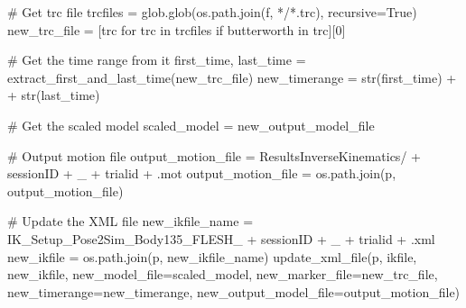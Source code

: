 \documentclass[
  letterpaper,
  DIV=11,
  numbers=noendperiod]{scrreprt}
\newenvironment{Shaded}{\begin{snugshade}}{\end{snugshade}}
\newcommand{\BuiltInTok}[1]{\textcolor[rgb]{0.00,0.23,0.31}{#1}}
\newcommand{\CommentTok}[1]{\textcolor[rgb]{0.37,0.37,0.37}{#1}}
\newcommand{\ControlFlowTok}[1]{\textcolor[rgb]{0.00,0.23,0.31}{#1}}
\newcommand{\DecValTok}[1]{\textcolor[rgb]{0.68,0.00,0.00}{#1}}
\newcommand{\KeywordTok}[1]{\textcolor[rgb]{0.00,0.23,0.31}{#1}}
\newcommand{\NormalTok}[1]{\textcolor[rgb]{0.00,0.23,0.31}{#1}}
\newcommand{\OperatorTok}[1]{\textcolor[rgb]{0.37,0.37,0.37}{#1}}
\newcommand{\StringTok}[1]{\textcolor[rgb]{0.13,0.47,0.30}{#1}}
\newcommand{\VariableTok}[1]{\textcolor[rgb]{0.07,0.07,0.07}{#1}}
\begin{document}
\begin{Shaded}
\begin{Highlighting}[]
            \CommentTok{\# Get trc file}
\NormalTok{            trcfiles }\OperatorTok{=}\NormalTok{ glob.glob(os.path.join(f, }\StringTok{\textquotesingle{}*/*.trc\textquotesingle{}}\NormalTok{), recursive}\OperatorTok{=}\VariableTok{True}\NormalTok{)}
\NormalTok{            new\_trc\_file }\OperatorTok{=}\NormalTok{ [trc }\ControlFlowTok{for}\NormalTok{ trc }\KeywordTok{in}\NormalTok{ trcfiles }\ControlFlowTok{if} \StringTok{\textquotesingle{}butterworth\textquotesingle{}} \KeywordTok{in}\NormalTok{ trc][}\DecValTok{0}\NormalTok{]}

            \CommentTok{\# Get the time range from it}
\NormalTok{            first\_time, last\_time }\OperatorTok{=}\NormalTok{ extract\_first\_and\_last\_time(new\_trc\_file)}
\NormalTok{            new\_timerange }\OperatorTok{=} \BuiltInTok{str}\NormalTok{(first\_time) }\OperatorTok{+} \StringTok{\textquotesingle{} \textquotesingle{}} \OperatorTok{+} \BuiltInTok{str}\NormalTok{(last\_time)}

            \CommentTok{\# Get the scaled model}
\NormalTok{            scaled\_model }\OperatorTok{=}\NormalTok{ new\_output\_model\_file}
      
            \CommentTok{\# Output motion file}
\NormalTok{            output\_motion\_file }\OperatorTok{=} \StringTok{\textquotesingle{}ResultsInverseKinematics/\textquotesingle{}} \OperatorTok{+}\NormalTok{ sessionID }\OperatorTok{+} \StringTok{\textquotesingle{}\_\textquotesingle{}} \OperatorTok{+}\NormalTok{ trialid }\OperatorTok{+} \StringTok{\textquotesingle{}.mot\textquotesingle{}}
\NormalTok{            output\_motion\_file }\OperatorTok{=}\NormalTok{ os.path.join(p, output\_motion\_file)}

            \CommentTok{\# Update the XML file}
\NormalTok{            new\_ikfile\_name }\OperatorTok{=} \StringTok{\textquotesingle{}IK\_Setup\_Pose2Sim\_Body135\_FLESH\_\textquotesingle{}} \OperatorTok{+}\NormalTok{ sessionID }\OperatorTok{+} \StringTok{\textquotesingle{}\_\textquotesingle{}} \OperatorTok{+}\NormalTok{ trialid }\OperatorTok{+} \StringTok{\textquotesingle{}.xml\textquotesingle{}}
\NormalTok{            new\_ikfile }\OperatorTok{=}\NormalTok{ os.path.join(p, new\_ikfile\_name)}
\NormalTok{            update\_xml\_file(p, ikfile, new\_ikfile, new\_model\_file}\OperatorTok{=}\NormalTok{scaled\_model, new\_marker\_file}\OperatorTok{=}\NormalTok{new\_trc\_file, new\_timerange}\OperatorTok{=}\NormalTok{new\_timerange, new\_output\_model\_file}\OperatorTok{=}\NormalTok{output\_motion\_file)}


\end{Highlighting}
\end{Shaded}
\end{document}
